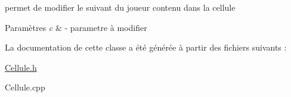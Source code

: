 permet de modifier le suivant du joueur contenu dans la cellule 


\begin{DoxyParams}{\-Paramètres}
{\em c} & -\/ parametre à modifier \\
\hline
\end{DoxyParams}


\-La documentation de cette classe a été générée à partir des fichiers suivants \-:\begin{DoxyCompactItemize}
\item 
\hyperlink{_cellule_8h}{\-Cellule.\-h}\item 
\-Cellule.\-cpp\end{DoxyCompactItemize}
